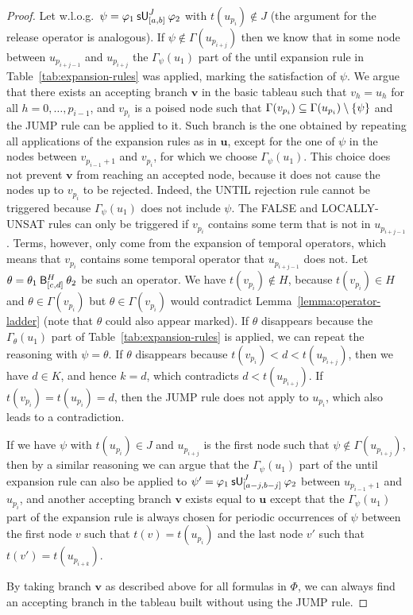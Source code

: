 \documentclass[acmsmall,screen]{acmart}
\begin{document}
\begin{proof}
Let w.l.o.g.\ $\psi = \suntil[J]{[a,b]}{\varphi_1}{\varphi_2}$ with $t(u_{p_i}) \not\in J$
(the argument for the release operator is analogous).
If $\psi \not\in \Gamma(u_{p_{i+j}})$ then we know that in some node between $u_{p_{i+j-1}}$ and $u_{p_{i+j}}$
the $\Gamma_\psi(u_1)$ part of the until expansion rule in Table~\ref{tab:expansion-rules} was applied,
marking the satisfaction of $\psi$.
We argue that there exists an accepting branch $\mathbf{v}$ in the basic tableau
such that $v_h = u_h$ for all $h = 0, \dots, p_{i-1}$, and $v_{p_i}$ is a poised node such that
$\Gamma(v_{p_i}) \subseteq \Gamma(u_{p_i}) \setminus \set{\psi}$ and the \textsf{JUMP} rule can be applied to it.
Such branch is the one obtained by repeating all applications of the expansion rules as in $\mathbf{u}$,
except for the one of $\psi$ in the nodes between $v_{p_{i-1}+1}$ and $v_{p_i}$, for which we choose $\Gamma_\psi(u_1)$.
This choice does not prevent $\mathbf{v}$ from reaching an accepted node,
because it does not cause the nodes up to $v_{p_i}$ to be rejected.
Indeed, the \textsf{UNTIL} rejection rule cannot be triggered because $\Gamma_\psi(u_1)$ does not include $\psi$.
The \textsf{FALSE} and \textsf{LOCALLY-UNSAT} rules can only be triggered if $v_{p_i}$ contains some term that is not in $u_{p_{i+j-1}}$.
Terms, however, only come from the expansion of temporal operators, which means that $v_{p_i}$ contains some temporal operator that $u_{p_{i+j-1}}$ does not.
Let $\theta = \anybinop[H]{[c,d]}{\theta_1}{\theta_2}$ be such an operator.
We have $t(v_{p_i}) \not\in H$, because $t(v_{p_i}) \in H$ and $\theta \in \Gamma(v_{p_i})$ but $\theta \in \Gamma(v_{p_i})$
would contradict Lemma~\ref{lemma:operator-ladder} (note that $\theta$ could also appear marked).
If $\theta$ disappears because the $\Gamma_\theta(u_1)$ part of Table~\ref{tab:expansion-rules} is applied, we can repeat the reasoning with $\psi = \theta$.
If $\theta$ disappears because $t(v_{p_i}) < d < t(u_{p_{i+j}})$,
then we have $d \in K$, and hence $k = d$, which contradicts $d < t(u_{p_{i+j}})$.
If $t(v_{p_i}) = t(u_{p_i}) = d$, then the \textsf{JUMP} rule does not apply to $u_{p_i}$,
which also leads to a contradiction.

If we have $\psi$ with $t(u_{p_i}) \in J$ and $u_{p_{i+j}}$ is the first node such that $\psi \not\in \Gamma(u_{p_{i+j}})$,
then by a similar reasoning we can argue that
the $\Gamma_\psi(u_1)$ part of the until expansion rule can also be applied to
$\psi' = \suntil[J]{[a-j,b-j]}{\varphi_1}{\varphi_2}$ between $u_{p_{i-1}+1}$ and $u_{p_i}$,
and another accepting branch $\mathbf{v}$ exists equal to $\mathbf{u}$ except that
the $\Gamma_\psi(u_1)$ part of the expansion rule is always chosen for periodic occurrences of $\psi$
between the first node $v$ such that $t(v) = t(u_{p_i})$ and the last node $v'$ such that $t(v') = t(u_{p_{i+k}})$.

By taking branch $\mathbf{v}$ as described above for all formulas in $\Phi$, we can always find an accepting branch in the tableau built without using the \textsf{JUMP} rule.
\end{proof}
\end{document}
